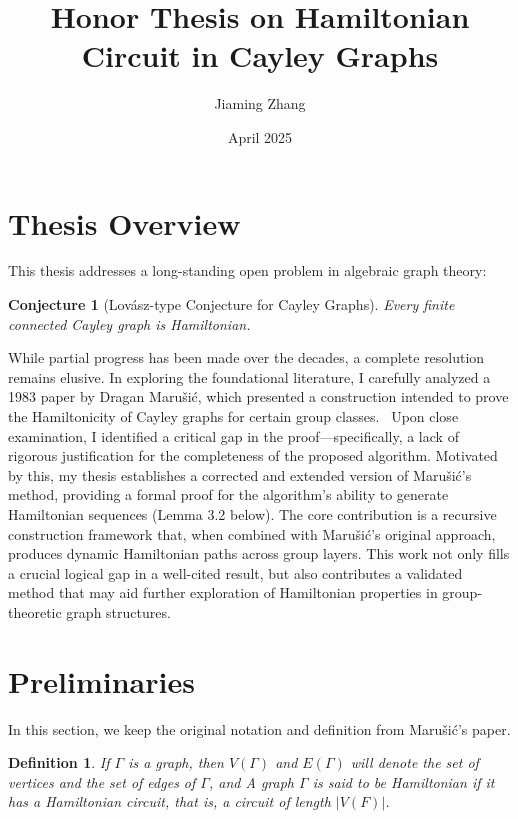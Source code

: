 \documentclass{article}
\title{Honor Thesis on Hamiltonian Circuit in Cayley Graphs}
\author{Jiaming Zhang}
\date{April 2025}
\newtheorem{definition}{Definition}
\newtheorem{conjecture}{Conjecture}
\begin{document}
\maketitle
\section{Thesis Overview}
This thesis addresses a long-standing open problem in algebraic graph theory: 
\begin{conjecture}[Lov\'asz-type Conjecture for Cayley Graphs]
Every finite connected Cayley graph is Hamiltonian.
\end{conjecture}

While partial progress has been made over the decades, a complete resolution remains elusive. In exploring the foundational literature, I carefully analyzed a 1983 paper by Dragan Marušić, which presented a construction intended to prove the Hamiltonicity of Cayley graphs for certain group classes.~\cite{marusic1983} Upon close examination, I identified a critical gap in the proof—specifically, a lack of rigorous justification for the completeness of the proposed algorithm. Motivated by this, my thesis establishes a corrected and extended version of Marušić’s method, providing a formal proof for the algorithm’s ability to generate Hamiltonian sequences (Lemma 3.2 below). The core contribution is a recursive construction framework that, when combined with Marušić’s original approach, produces dynamic Hamiltonian paths across group layers. This work not only fills a crucial logical gap in a well-cited result, but also contributes a validated method that may aid further exploration of Hamiltonian properties in group-theoretic graph structures.~\cite{stelow2017}~\cite{bajo2021}

\section{Preliminaries}
In this section, we keep the original notation and definition from Marušić's paper.

\begin{definition} 
If $\Gamma$ is a graph, then $V(\Gamma)$ and $E(\Gamma)$ will denote the set of vertices and the set of edges of $\Gamma$, and A graph $\Gamma$ is said to be \textit{Hamiltonian} if it has a \textit{Hamiltonian} circuit, that is, a circuit of length $|V(F)|$.
\end{definition}
\end{document}
